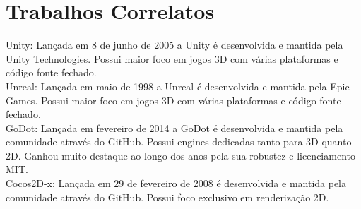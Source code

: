 \documentclass[12pt, 
openright, 
oneside, 
a4paper,    
brazil]{facom-ufu-abntex2}
\begin{document}
\fi

\chapter{Trabalhos Correlatos}
\label{sec:trabcorr}

Unity: Lançada em 8 de junho de 2005 a Unity é desenvolvida e mantida pela Unity Technologies. Possui maior foco em jogos 3D com várias plataformas e código fonte fechado.\\

Unreal: Lançada em maio de 1998 a Unreal é desenvolvida e mantida pela Epic Games. Possui maior foco em jogos 3D com várias plataformas e código fonte fechado.\\

GoDot: Lançada em fevereiro de 2014 a GoDot é desenvolvida e mantida pela comunidade através do GitHub. Possui engines dedicadas tanto para 3D quanto 2D. Ganhou muito destaque ao longo dos anos pela sua robustez e licenciamento MIT.\\

Cocos2D-x: Lançada em 29 de fevereiro de 2008 é desenvolvida e mantida pela comunidade através do GitHub. Possui foco exclusivo em renderização 2D.\\

\end{document}

